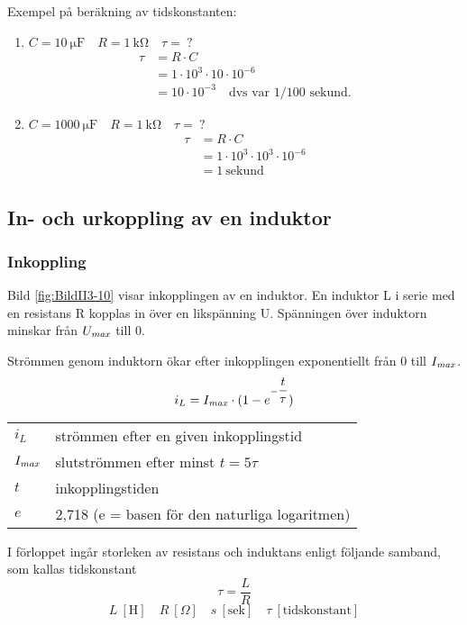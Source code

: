 Exempel på beräkning av tidskonstanten:
\begin{enumerate}
\item \(C = \SI{10}{\micro\farad} \quad R = \SI{1}{\kilo\ohm} \quad \tau =\ ?\)
  \begin{align*}
    \tau &= R \cdot C \\
    &= 1 \cdot 10^3 \cdot 10 \cdot 10^{-6} \\
    &= 10 \cdot 10^{-3} \quad \text{dvs var 1/100 sekund.}
  \end{align*}
\item \(C = \SI{1000}{\micro\farad} \quad R = \SI{1}{\kilo\ohm} \quad \tau =\ ?\)
  \begin{align*}
    \tau &= R \cdot C \\
    &= 1 \cdot 10^3 \cdot 10^3 \cdot 10^{-6} \\
    &= 1\ \text{sekund}
  \end{align*}
\end{enumerate}

\subsection{In- och urkoppling av en induktor}

\subsubsection{Inkoppling}


Bild \ref{fig:BildII3-10} visar inkopplingen av en induktor.
En induktor L i serie med en resistans R kopplas in över en likspänning U.
Spänningen över induktorn minskar från \(U_{\it max}\) till 0.

Strömmen genom induktorn ökar efter inkopplingen exponentiellt från 0 till \(I_{\it max}\).
%
\[i_L = I_{\it max} \cdot (1-e^{-\dfrac{t}{\tau}} )\]
%
\begin{tabular}{lp{}}
  \(i_L\) &  strömmen efter en given inkopplingstid \\
  \(I_{\it max}\) & slutströmmen efter minst \(t = 5\tau\) \\
  \(t\) & inkopplingstiden \\
  \(e\) & 2,718 (e = basen för den naturliga logaritmen) \\
\end{tabular}

I förloppet ingår storleken av resistans och induktans enligt följande samband,
som kallas tidskonstant
%
\[\tau = \frac{L}{R}\]
%
\[
L\ [\text{H}] \quad
R\ [\Omega] \quad
s\ [\text{sek}] \quad
\tau\ [\text{tidskonstant}]
\]

